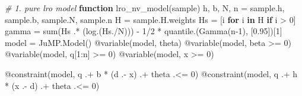 \documentclass[
  10pt,
  a4paper,
,tablecaptionabove
]{scrartcl}
\newenvironment{Shaded}{}{}
\newcommand{\CommentTok}[1]{\textcolor[rgb]{0.38,0.63,0.69}{\textit{#1}}}
\newcommand{\FloatTok}[1]{\textcolor[rgb]{0.25,0.63,0.44}{#1}}
\newcommand{\KeywordTok}[1]{\textcolor[rgb]{0.00,0.44,0.13}{\textbf{#1}}}
\newcommand{\NormalTok}[1]{#1}
\newcommand{\OperatorTok}[1]{\textcolor[rgb]{0.40,0.40,0.40}{#1}}
\newcommand{\PreprocessorTok}[1]{\textcolor[rgb]{0.74,0.48,0.00}{#1}}
\begin{document}
\begin{Shaded}
\begin{Highlighting}[]
\CommentTok{\# 1. pure lro model}
\KeywordTok{function}\NormalTok{ lro\_nv\_model(sample)}
\NormalTok{    h}\OperatorTok{,}\NormalTok{ b}\OperatorTok{,}\NormalTok{ N}\OperatorTok{,}\NormalTok{ n }\OperatorTok{=}\NormalTok{ sample.h}\OperatorTok{,}\NormalTok{ sample.b}\OperatorTok{,}\NormalTok{ sample.N}\OperatorTok{,}\NormalTok{ sample.n}
\NormalTok{    H }\OperatorTok{=}\NormalTok{ sample.H.weights}
\NormalTok{    Hs }\OperatorTok{=}\NormalTok{ [i }\KeywordTok{for}\NormalTok{ i }\KeywordTok{in}\NormalTok{ H }\KeywordTok{if}\NormalTok{ i }\OperatorTok{\textgreater{}} \FloatTok{0}\NormalTok{]}
\NormalTok{    gamma }\OperatorTok{=}\NormalTok{ sum(Hs }\OperatorTok{.*}\NormalTok{ (log.(Hs}\OperatorTok{./}\NormalTok{N))) }\OperatorTok{{-}} \FloatTok{1}\OperatorTok{/}\FloatTok{2} \OperatorTok{*}\NormalTok{ quantile.(Gamma(n}\OperatorTok{{-}}\FloatTok{1}\NormalTok{)}\OperatorTok{,}\NormalTok{ [}\FloatTok{0.95}\NormalTok{])[}\FloatTok{1}\NormalTok{]}
\NormalTok{    model }\OperatorTok{=}\NormalTok{ JuMP.Model()}
    \PreprocessorTok{@variable}\NormalTok{(model}\OperatorTok{,}\NormalTok{ theta)}
    \PreprocessorTok{@variable}\NormalTok{(model}\OperatorTok{,}\NormalTok{ beta }\OperatorTok{\textgreater{}=} \FloatTok{0}\NormalTok{)}
    \PreprocessorTok{@variable}\NormalTok{(model}\OperatorTok{,}\NormalTok{ q[}\FloatTok{1}\OperatorTok{:}\NormalTok{n] }\OperatorTok{\textgreater{}=} \FloatTok{0}\NormalTok{)}
    \PreprocessorTok{@variable}\NormalTok{(model}\OperatorTok{,}\NormalTok{ x }\OperatorTok{\textgreater{}=} \FloatTok{0}\NormalTok{)}

    \PreprocessorTok{@constraint}\NormalTok{(model}\OperatorTok{,}\NormalTok{ q .}\OperatorTok{+}\NormalTok{ b }\OperatorTok{*}\NormalTok{ (d .}\OperatorTok{{-}}\NormalTok{ x) .}\OperatorTok{+}\NormalTok{ theta .}\OperatorTok{\textless{}=} \FloatTok{0}\NormalTok{)}
    \PreprocessorTok{@constraint}\NormalTok{(model}\OperatorTok{,}\NormalTok{ q .}\OperatorTok{+}\NormalTok{ h }\OperatorTok{*}\NormalTok{ (x .}\OperatorTok{{-}}\NormalTok{ d) .}\OperatorTok{+}\NormalTok{ theta .}\OperatorTok{\textless{}=} \FloatTok{0}\NormalTok{)}


\end{Highlighting}
\end{Shaded}
\end{document}

